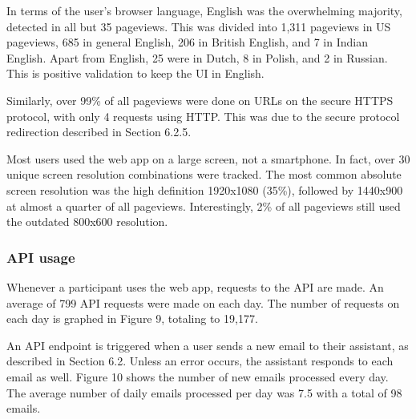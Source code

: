 \documentclass{article}
\begin{document}
In terms of the user's browser language, English was the overwhelming majority, detected in all but 35 pageviews. This was divided into 1,311 pageviews in US pageviews, 685 in general English, 206 in British English, and 7 in Indian English. Apart from English, 25 were in Dutch, 8 in Polish, and 2 in Russian. This is positive validation to keep the UI in English.

Similarly, over 99\% of all pageviews were done on URLs on the secure HTTPS protocol, with only 4 requests using HTTP. This was due to the secure protocol redirection described in Section 6.2.5.

Most users used the web app on a large screen, not a smartphone. In fact, over 30 unique screen resolution combinations were tracked. The most common absolute screen resolution was the high definition 1920x1080 (35\%), followed by 1440x900 at almost a quarter of all pageviews. Interestingly, 2\% of all pageviews still used the outdated 800x600 resolution.

\subsubsection{API usage}

Whenever a participant uses the web app, requests to the API are made. An average of 799 API requests were made on each day. The number of requests on each day is graphed in Figure 9, totaling to 19,177.

An API endpoint is triggered when a user sends a new email to their assistant, as described in Section 6.2. Unless an error occurs, the assistant responds to each email as well. Figure 10 shows the number of new emails processed every day. The average number of daily emails processed per day was 7.5 with a total of 98 emails.
\end{document}
